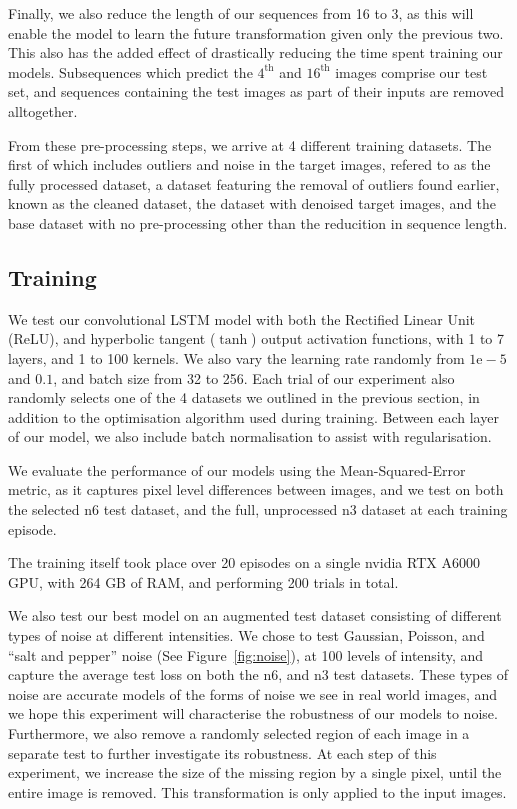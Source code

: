 \documentclass[twocolumn]{article}
\begin{document}
Finally, we also reduce the length of our sequences from 16 to 3, as this will enable the model to learn the future transformation given only the previous two. This also has the added effect of drastically reducing the time spent training our models. Subsequences which predict the $4^\text{th}$ and $16^\text{th}$ images comprise our test set, and sequences containing the test images as part of their inputs are removed alltogether. 

From these pre-processing steps, we arrive at 4 different training datasets. The first of which includes outliers and noise in the target images, refered to as the fully processed dataset, a dataset featuring the removal of outliers found earlier, known as the cleaned dataset, the dataset with denoised target images, and the base dataset with no pre-processing other than the reducition in sequence length. 

\subsection{Training}

We test our convolutional LSTM model with both the Rectified Linear Unit (ReLU), and hyperbolic tangent ($\tanh$) output activation functions, with 1 to 7 layers, and 1 to 100 kernels. We also vary the learning rate randomly from $1\mathrm{e}-5$ and $0.1$, and batch size from 32 to 256. Each trial of our experiment also randomly selects one of the 4 datasets we outlined in the previous section, in addition to the optimisation algorithm used during training. Between each layer of our model, we also include batch normalisation to assist with regularisation. 

We evaluate the performance of our models using the Mean-Squared-Error metric, as it captures pixel level differences between images, and we test on both the selected n6 test dataset, and the full, unprocessed n3 dataset at each training episode. 

The training itself took place over 20 episodes on a single nvidia RTX A6000 GPU, with 264 GB of RAM, and performing 200 trials in total. 

We also test our best model on an augmented test dataset consisting of different types of noise at different intensities. We chose to test Gaussian, Poisson, and ``salt and pepper'' noise (See Figure~\ref{fig:noise}), at 100 levels of intensity, and capture the average test loss on both the n6, and n3 test datasets. These types of noise are accurate models of the forms of noise we see in real world images, and we hope this experiment will characterise the robustness of our models to noise. Furthermore, we also remove a randomly selected region of each image in a separate test to further investigate its robustness. At each step of this experiment, we increase the size of the missing region by a single pixel, until the entire image is removed. This transformation is only applied to the input images. 
\end{document}
